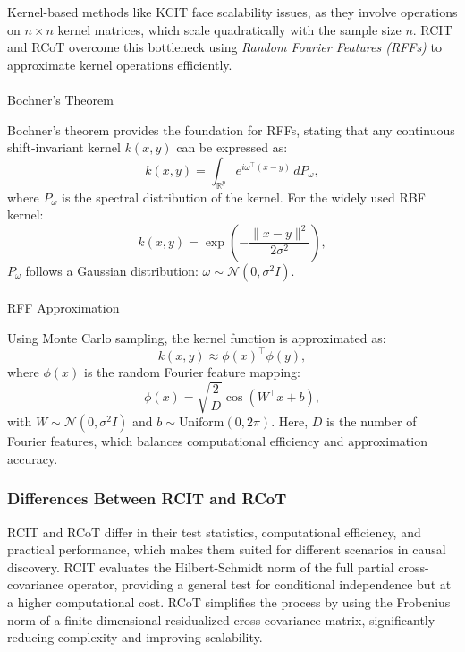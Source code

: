 \documentclass[
]{article}
\makeatletter
\let\oldparagraph\paragraph
\renewcommand{\paragraph}{
    \@ifstar
      \xxxParagraphStar
      \xxxParagraphNoStar
  }
\newcommand{\xxxParagraphStar}[1]{\oldparagraph*{#1}\mbox{}}
\newcommand{\xxxParagraphNoStar}[1]{\oldparagraph{#1}\mbox{}}
\makeatother
\begin{document}
Kernel-based methods like KCIT face scalability issues, as they involve
operations on \(n \times n\) kernel matrices, which scale quadratically
with the sample size \(n\). RCIT and RCoT overcome this bottleneck using
\emph{Random Fourier Features (RFFs)} to approximate kernel operations
efficiently.

\paragraph{Bochner's Theorem}\label{bochners-theorem}

Bochner's theorem provides the foundation for RFFs, stating that any
continuous shift-invariant kernel \(k(x, y)\) can be expressed as: \[
k(x, y) = \int_{\mathbb{R}^p} e^{i \omega^\top (x - y)} \, dP_\omega,
\] where \(P_\omega\) is the spectral distribution of the kernel. For
the widely used RBF kernel: \[
k(x, y) = \exp\left(-\frac{\|x - y\|^2}{2\sigma^2}\right),
\] \(P_\omega\) follows a Gaussian distribution:
\(\omega \sim \mathcal{N}(0, \sigma^2 I)\).

\paragraph{RFF Approximation}\label{rff-approximation}

Using Monte Carlo sampling, the kernel function is approximated as: \[
k(x, y) \approx \phi(x)^\top \phi(y),
\] where \(\phi(x)\) is the random Fourier feature mapping: \[
\phi(x) = \sqrt{\frac{2}{D}} \cos(W^\top x + b),
\] with \(W \sim \mathcal{N}(0, \sigma^2 I)\) and
\(b \sim \text{Uniform}(0, 2\pi)\). Here, \(D\) is the number of Fourier
features, which balances computational efficiency and approximation
accuracy.

\subsubsection{Differences Between RCIT and
RCoT}\label{differences-between-rcit-and-rcot}

RCIT and RCoT differ in their test statistics, computational efficiency,
and practical performance, which makes them suited for different
scenarios in causal discovery. RCIT evaluates the Hilbert-Schmidt norm
of the full partial cross-covariance operator, providing a general test
for conditional independence but at a higher computational cost. RCoT
simplifies the process by using the Frobenius norm of a
finite-dimensional residualized cross-covariance matrix, significantly
reducing complexity and improving scalability.
\end{document}
